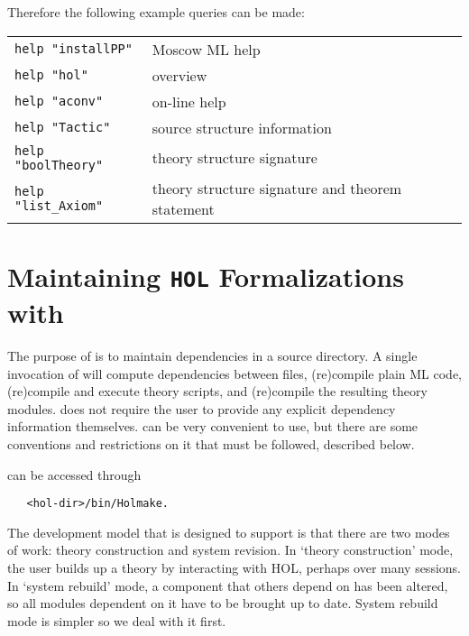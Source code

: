 Therefore the following example queries can be made:

\begin{table}[h]
  \begin{center}
    \begin{tabular}{|l|l|} \hline
      \verb+help "installPP"+ & Moscow ML help \\
      \verb+help "hol"+ &  \HOL{} overview \\
      \verb+help "aconv"+ &  on-line \HOL{} help \\
      \verb+help "Tactic"+ & \HOL{} source structure information \\
      \verb+help "boolTheory"+ &  theory structure signature \\
      \verb+help "list_Axiom"+ & theory structure signature and theorem
      statement \\ \hline
    \end{tabular}
  \end{center}
\end{table}

\section{Maintaining \texttt{HOL} Formalizations with \holmake}
\label{Holmake}

The purpose of \holmake{} is to maintain dependencies in a \HOL{}
source directory. A single invocation of \holmake{} will compute
dependencies between files, (re)compile plain ML code, (re)compile and
execute theory scripts, and (re)compile the resulting theory modules.
\holmake{} does not require the user to provide any explicit
dependency information themselves. \holmake{} can be very convenient
to use, but there are some conventions and restrictions on it that
must be followed, described below.




\holmake{} can be accessed through
\begin{verbatim}
   <hol-dir>/bin/Holmake.
\end{verbatim}

The development model that \holmake{} is designed to support is that
there are two modes of work: theory construction and system revision.
In `theory construction' mode, the user builds up a theory by
interacting with HOL, perhaps over many sessions. In `system rebuild'
mode, a component that others depend on has been altered, so all modules
dependent on it have to be brought up to date. System rebuild mode is
simpler so we deal with it first.

